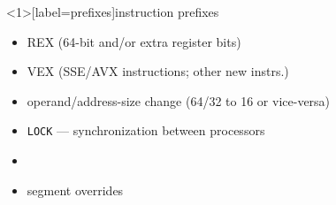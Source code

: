 
\begin{frame}<1>[label=prefixes]{instruction prefixes}
    \begin{itemize}
    \item REX (64-bit and/or extra register bits)
    \item VEX (SSE/AVX instructions; other new instrs.)
    \item operand/address-size change (64/32 to 16 or vice-versa)
    \item {\tt LOCK} --- synchronization between processors
    \item {}
    \item segment overrides
    \end{itemize}
\end{frame}


